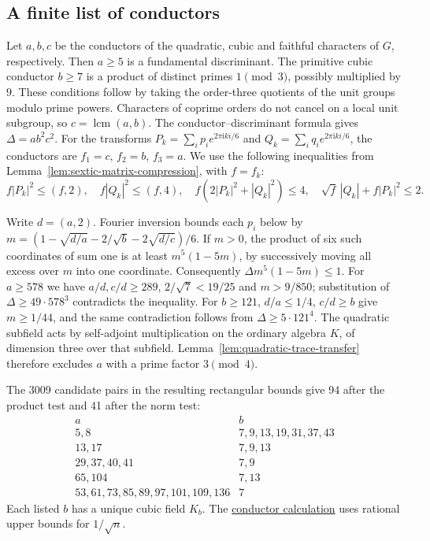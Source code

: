 \documentclass[11pt,reqno]{amsart}
\newcommand{\codecheck}[2]{\href{https://github.com/sebastienpalcoux/grothendieck-ring-classification/blob/d5750105bb5758f3ad38d2e5464dfcc12c019816/supplements/rank6/sphericality/#1}{#2}}
\theoremstyle{remark}\newtheorem{remark}[theorem]{Remark}
\numberwithin{equation}{section}
\begin{document}
\subsection{A finite list of conductors}

Let $a,b,c$ be the conductors of the quadratic, cubic and faithful
characters of $G$, respectively. Then $a\ge5$ is a fundamental
discriminant. The primitive cubic conductor $b\ge7$ is a product of
distinct primes $1\pmod3$, possibly multiplied by $9$. These
conditions follow by taking the order-three quotients of the unit
groups modulo prime powers. Characters of coprime orders do not
cancel on a local unit subgroup, so $c=\operatorname{lcm}(a,b)$.
The conductor--discriminant formula gives $\Delta=ab^2c^2$. 
For the transforms $P_k=\sum_i p_i e^{2\pi\mathrm i ki/6}$ and
$Q_k=\sum_i q_i e^{2\pi\mathrm i ki/6}$, the conductors are
$f_1=c$, $f_2=b$, $f_3=a$. We use the following inequalities from
Lemma~\ref{lem:sextic-matrix-compression}, with $f=f_k$:
\[
 f|P_k|^2\le(f,2),\quad f|Q_k|^2\le(f,4),\quad
 f(2|P_k|^2+|Q_k|^2)\le4,\quad
 \sqrt f\,|Q_k|+f|P_k|^2\le2.\tag{S2}
\]

Write $d=(a,2)$. Fourier inversion bounds each $p_i$ below by
$m=(1-\sqrt{d/a}-2/\sqrt b-2\sqrt{d/c})/6$. If $m>0$, the product
of six such coordinates of sum one is at least $m^5(1-5m)$, by
successively moving all excess over $m$ into one coordinate.
Consequently $\Delta m^5(1-5m)\le1$. For $a\ge578$ we have
$a/d,c/d\ge289$, $2/\sqrt7<19/25$ and $m>9/850$; substitution of
$\Delta\ge49\cdot578^3$ contradicts the inequality. For $b\ge121$,
$d/a\le1/4$, $c/d\ge b$ give $m\ge1/44$, and the same contradiction
follows from $\Delta\ge5\cdot121^4$. The quadratic subfield acts by self-adjoint multiplication on the
ordinary algebra $K$, of dimension three over that subfield.
Lemma~\ref{lem:quadratic-trace-transfer} therefore excludes $a$ with
a prime factor $3\pmod4$.

The 3009 candidate pairs in the resulting rectangular bounds give
94 after the product test and 41 after the norm test:
\[
\begin{array}{c|l}
 a& b\\\hline
 5,8&7,9,13,19,31,37,43\\
 13,17&7,9,13\\
 29,37,40,41&7,9\\
 65,104&7,13\\
 53,61,73,85,89,97,101,109,136&7
\end{array}
\]
Each listed $b$ has a unique cubic field $K_b$. The
\codecheck{sextic_complement/sextic_conductor_sieve.py}{conductor calculation}
uses rational upper bounds for $1/\sqrt n$.
\end{document}
